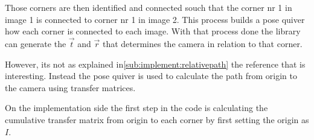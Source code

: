 Those corners are then identified and connected souch that the corner nr 1 in image 1 is connected to corner nr 1 in image 2.
This process builds a pose quiver how each corner is connected to each image.
With that process done the \aruco{ } library can generate the $\vec{t}$ and $\vec{r}$ that determines the camera in relation to that corner.

However, its not as explained in\ref{sub:implement:relativepath} the reference that is interesting.
Instead the pose quiver is used to calculate the path from origin to the camera using transfer matrices.

On the implementation side the first step in the code is calculating the cumulative transfer matrix from origin to each corner by first setting the origin as $I$.




